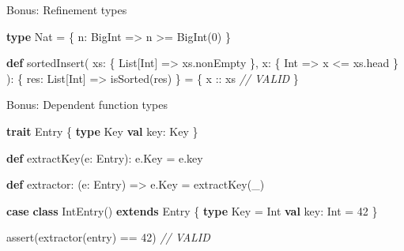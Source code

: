 \documentclass[
  ignorenonframetext,
]{beamer}
\newenvironment{Shaded}{}{}
\newcommand{\CommentTok}[1]{\textcolor[rgb]{0.38,0.63,0.69}{\textit{#1}}}
\newcommand{\DecValTok}[1]{\textcolor[rgb]{0.25,0.63,0.44}{#1}}
\newcommand{\FunctionTok}[1]{\textcolor[rgb]{0.02,0.16,0.49}{#1}}
\newcommand{\KeywordTok}[1]{\textcolor[rgb]{0.00,0.44,0.13}{\textbf{#1}}}
\newcommand{\NormalTok}[1]{#1}
\begin{document}
\begin{frame}[fragile]{Bonus: Refinement types}
\protect\hypertarget{bonus-refinement-types}{}

\begin{Shaded}
\begin{Highlighting}[]
\KeywordTok{type}\NormalTok{ Nat = \{ n: BigInt => n >= }\FunctionTok{BigInt}\NormalTok{(}\DecValTok{0}\NormalTok{) \}}
\end{Highlighting}
\end{Shaded}

\end{frame}

\begin{frame}[fragile]

\begin{Shaded}
\begin{Highlighting}[]
\KeywordTok{def} \FunctionTok{sortedInsert}\NormalTok{(}
\NormalTok{  xs: \{ List[Int] => xs.}\FunctionTok{nonEmpty}\NormalTok{ \},}
\NormalTok{  x:  \{ Int => x <= xs.}\FunctionTok{head}\NormalTok{ \}}
\NormalTok{): \{ res: List[Int] => }\FunctionTok{isSorted}\NormalTok{(res) \} = \{}
\NormalTok{  x :: xs }\CommentTok{// VALID}
\NormalTok{\}}
\end{Highlighting}
\end{Shaded}

\end{frame}

\begin{frame}[fragile]{Bonus: Dependent function types}
\protect\hypertarget{bonus-dependent-function-types}{}

\begin{Shaded}
\begin{Highlighting}[]
\KeywordTok{trait}\NormalTok{ Entry \{}
  \KeywordTok{type}\NormalTok{ Key}
  \KeywordTok{val}\NormalTok{ key: Key}
\NormalTok{\}}

\KeywordTok{def} \FunctionTok{extractKey}\NormalTok{(e: Entry): e.}\FunctionTok{Key}\NormalTok{ = e.}\FunctionTok{key}

\KeywordTok{def}\NormalTok{ extractor: (e: Entry) => e.}\FunctionTok{Key}\NormalTok{ = }\FunctionTok{extractKey}\NormalTok{(_)}
\end{Highlighting}
\end{Shaded}

\end{frame}

\begin{frame}[fragile]

\begin{Shaded}
\begin{Highlighting}[]
\KeywordTok{case} \KeywordTok{class} \FunctionTok{IntEntry}\NormalTok{() }\KeywordTok{extends}\NormalTok{ Entry \{}
  \KeywordTok{type}\NormalTok{ Key = Int}
  \KeywordTok{val}\NormalTok{ key: Int = }\DecValTok{42}
\NormalTok{\}}

\FunctionTok{assert}\NormalTok{(}\FunctionTok{extractor}\NormalTok{(entry) == }\DecValTok{42}\NormalTok{) }\CommentTok{// VALID}
\end{Highlighting}
\end{Shaded}

\end{frame}
\end{document}
